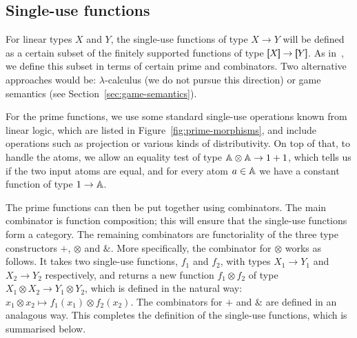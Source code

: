 \subsection{Single-use functions}
\label{sec:single-use-functions}

For linear types $X$ and $Y$, the single-use functions of type $X \to Y$  will be defined as a certain subset of the finitely supported functions of type $\sem X \to \sem Y$. As in~\cite{stefanski-phd}, we define this subset  in terms of certain prime and combinators. Two alternative approaches would be: $\lambda$-calculus (we do not pursue this direction) or game semantics (see Section~\ref{sec:game-semantics}).

For the prime functions, we use some standard single-use operations known from linear logic, which are listed in Figure~\ref{fig:prime-morphisms}, and include operations such as projection or various kinds of distributivity. On top of that, to handle the atoms,  we allow an equality test of type $\mathbb A \otimes \mathbb A \to 1 + 1$, which tells us if the two input atoms are equal, and for every atom $a \in \mathbb A$ we have a constant function of type $1 \to \mathbb A$.

The prime functions can then be put together using combinators. The main combinator is function composition; this will ensure that the single-use functions form a category. The remaining combinators are functoriality of the three type constructors $+$, $\otimes$ and $\&$. More specifically, the combinator for $\otimes$ works as follows. It takes two single-use functions, $f_1$ and $f_2$, with types $X_1 \to Y_1$ and $X_2 \to Y_2$ respectively, and returns a new function $f_1 \otimes f_2$ of type $X_1 \otimes X_2 \to Y_1 \otimes Y_2$, which is defined in the natural way: $x_1 \otimes x_2 \mapsto f_1(x_1) \otimes f_2(x_2)$.  The combinators for $+$ and $\&$ are defined in an analagous way. This completes the definition of the single-use functions, which is  summarised below.


